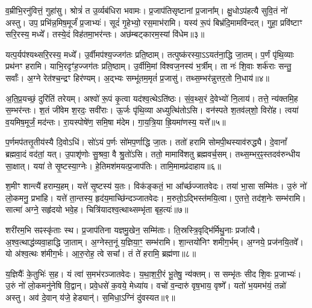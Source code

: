 व॒म्रीभि॒रनु॑\-वित्तं॒ गुहा॑सु।
श्रोत्रं॑ त उ॒र्व्यब॑धिरा भवामः।
प्र॒जा\-प॑तिसृष्टानां प्र॒जाना᳚म्।
क्षु॒धो\-ऽप॑हत्यै सुवि॒तं नो॑ अस्तु।
उप॒ प्रभि॑न्न॒मिष॒मूर्जं॑ प्र॒जाभ्यः॑।
सूदं॑ गृ॒हेभ्यो॒ रस॒माभ॑रामि।
यस्य॑ रू॒पं बिभ्र॑दि॒मामवि॑न्दत्।
गुहा॒ प्रवि॑ष्टाꣳ सरि॒रस्य॒ मध्ये᳚।
तस्ये॒दं विह॑तमा॒भर॑न्तः।
अछ॑म्बट्कारम॒स्यां वि॑धेम॥३॥

यत्प॒र्यप॑श्यथ्सरि॒रस्य॒ मध्ये᳚।
उ॒र्वीमप॑श्य॒ज्जग॑तः प्रति॒ष्ठाम्।
तत्पुष्क॑रस्या॒ऽऽयत॑ना॒द्धि जा॒तम्।
प॒र्णं पृ॑थि॒व्याः प्रथ॑नꣳ हरामि।
याभि॒रदृꣳ॑ह॒ज्जग॑तः प्रति॒ष्ठाम्।
उ॒र्वीमि॒मां वि॑श्वज॒नस्य॑ भ॒र्त्रीम्।
ता नः॑ शि॒वाः शर्क॑राः सन्तु॒ सर्वाः᳚।
अ॒ग्ने रेत॑श्च॒न्द्रꣳ हिर॑ण्यम्।
अ॒द्भ्यः सम्भू॑तम॒मृतं॑ प्र॒जासु॑।
तथ्स॒म्भर॑न्नुत्तर॒तो नि॒धाय॑॥४॥

अ॒ति॒प्र॒यच्छं॒ दुरि॑तिं तरेयम्।
अश्वो॑ रू॒पं कृ॒त्वा यद॑श्व॒त्थे\-ऽति॑ष्ठः।
सं॒व॒थ्स॒रं दे॒वेभ्यो॑ नि॒लाय॑।
तत्ते॒ न्य॑क्तमि॒ह स॒म्भर॑न्तः।
श॒तं जी॑वेम श॒रदः॒ सवी॑राः।
ऊ॒र्जः पृ॑थि॒व्या अध्युत्थि॑तोऽसि।
वन॑स्पते श॒तव॑ल्‌शो॒ विरो॑ह।
त्वया॑ व॒यमिष॒मूर्जं॒ मद॑न्तः।
रा॒यस्पोषे॑ण॒ समि॒षा म॑देम।
गा॒य॒त्रि॒या ह्रि॒यमा॑णस्य॒ यत्ते᳚॥५॥

प॒र्णमप॑तत्तृ॒तीय॑स्यै दि॒वोऽधि॑।
सो॑ऽयं प॒र्णः सो॑मप॒र्णाद्धि जा॒तः।
ततो॑ हरामि सोमपी॒थस्याव॑रुद्ध्यै।
दे॒वानां᳚ ब्रह्मवा॒दं वद॑तां॒ यत्।
उ॒पाशृ॑णोः सु॒श्रवा॒ वै श्रु॒तो॑ऽसि।
ततो॒ मामावि॑शतु ब्रह्मवर्च॒सम्।
तथ्स॒म्भर॒ꣴ॒स्तदव॑रुन्धीय सा॒क्षात्।
यया॑ ते सृ॒ष्टस्या॒ग्नेः।
हे॒तिमश॑मयत्प्र॒जा\-प॑तिः।
तामि॒मामप्र॑दाहाय॥६॥

श॒मीꣳ शान्त्यै॑ हराम्य॒हम्।
यत्ते॑ सृ॒ष्टस्य॑ य॒तः।
विक॑ङ्कतं॒ भा आ᳚र्च्छज्जातवेदः।
तया॑ भा॒सा सम्मि॑तः।
उ॒रुं नो॑ लो॒कमनु॒ प्रभा॑हि।
यत्ते॑ ता॒न्तस्य॒ हृद॑य॒माच्छि॑न्दञ्जातवेदः।
म॒रुतो॒\-ऽद्भिस्त॑मयि॒त्वा।
ए॒तत्ते॒ तद॑श॒नेः सम्भ॑रामि।
सात्मा॑ अग्ने॒ सहृ॑दयो भवे॒ह।
चित्रि॑यादश्व॒त्थाथ्सम्भृ॑ता बृह॒त्यः॑॥७॥

शरी॑रम॒भि सꣴस्कृ॑ताः स्थ।
प्र॒जा\-प॑तिना यज्ञमु॒खेन॒ सम्मि॑ताः।
ति॒स्रस्त्रि॒वृद्भि॑र्मिथु॒नाः प्रजा᳚त्यै।
अ॒श्व॒त्थाद्ध॑व्य\-वा॒हाद्धि जा॒ताम्।
अ॒ग्नेस्त॒नूं य॒ज्ञिया॒ꣳ॒ सम्भ॑रामि।
शा॒न्तयो॑निꣳ शमीग॒र्भम्।
अ॒ग्नये॒ प्रज॑नयि॒तवे᳚।
यो अ॑श्व॒त्थः श॑मीग॒र्भः।
आ॒रु॒रोह॒ त्वे सचा᳚।
तं ते॑ हरामि॒ ब्रह्म॑णा॥८॥

य॒ज्ञियैः᳚ के॒तुभिः॑ स॒ह।
यं त्वा॑ स॒मभ॑रञ्जातवेदः।
य॒था॒श॒री॒रं भू॒तेषु॒ न्य॑क्तम्।
स सम्भृ॑तः सीद शि॒वः प्र॒जाभ्यः॑।
उ॒रुं नो॑ लो॒कमनु॑नेषि वि॒द्वान्।
प्रवे॒धसे॑ क॒वये॒ मेध्या॑य।
वचो॑ व॒न्दारु॑ वृष॒भाय॒ वृष्णे᳚।
यतो॑ भ॒यमभ॑यं॒ तन्नो॑ अस्तु।
अव॑ दे॒वान् य॑जे॒ हेड्यान्॑।
स॒मिधा॒\-ऽग्निं दु॑वस्यत॥९॥


